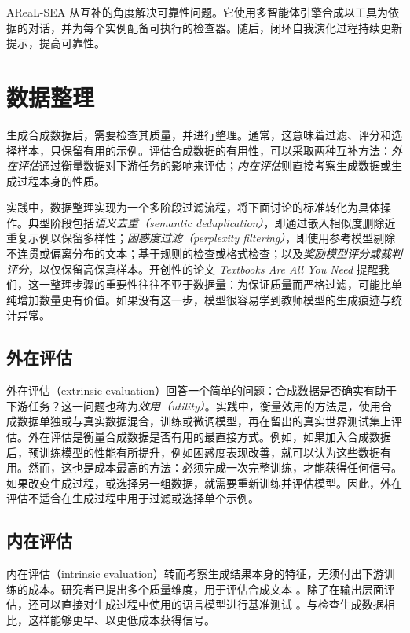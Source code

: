AReaL-SEA \citep{gao2026selfevolvingsyntheticdataverifiablereward} 从互补的角度解决可靠性问题。它使用多智能体引擎合成以工具为依据的对话，并为每个实例配备可执行的检查器。随后，闭环自我演化过程持续更新提示，提高可靠性。



\section{数据整理}
\label{sec:data-cur}

生成合成数据后，需要检查其质量，并进行整理。通常，这意味着过滤、评分和选择样本，只保留有用的示例。评估合成数据的有用性，可以采取两种互补方法：{\em 外在评估}通过衡量数据对下游任务的影响来评估；{\em 内在评估}则直接考察生成数据或生成过程本身的性质。

实践中，数据整理实现为一个多阶段过滤流程，将下面讨论的标准转化为具体操作。典型阶段包括{\em 语义去重（semantic deduplication）}，即通过嵌入相似度删除近重复示例以保留多样性；{\em 困惑度过滤（perplexity filtering）}，即使用参考模型剔除不连贯或偏离分布的文本；基于规则的检查或格式检查；以及{\em 奖励模型评分或裁判评分}，以仅保留高保真样本。开创性的论文 {\em Textbooks Are All You Need} \citep{gunasekar2023textbooksneed} 提醒我们，这一整理步骤的重要性往往不亚于数据量：为保证质量而严格过滤，可能比单纯增加数量更有价值。如果没有这一步，模型很容易学到教师模型的生成痕迹与统计异常。

\subsection{外在评估}
外在评估（extrinsic evaluation）回答一个简单的问题：合成数据是否确实有助于下游任务？这一问题也称为{\em 效用（utility）}。实践中，衡量效用的方法是，使用合成数据单独或与真实数据混合，训练或微调模型，再在留出的真实世界测试集上评估。外在评估是衡量合成数据是否有用的最直接方式。例如，如果加入合成数据后，预训练模型的性能有所提升，例如困惑度表现改善，就可以认为这些数据有用。然而，这也是成本最高的方法：必须完成一次完整训练，才能获得任何信号。如果改变生成过程，或选择另一组数据，就需要重新训练并评估模型。因此，外在评估不适合在生成过程中用于过滤或选择单个示例。


\subsection{内在评估}
内在评估（intrinsic evaluation）转而考察生成结果本身的特征，无须付出下游训练的成本。研究者已提出多个质量维度，用于评估合成文本 \citep{ramesh-etal-2025-synthtexteval}。除了在输出层面评估，还可以直接对生成过程中使用的语言模型进行基准测试 \citep{kim-etal-2025-evaluating}。与检查生成数据相比，这样能够更早、以更低成本获得信号。


